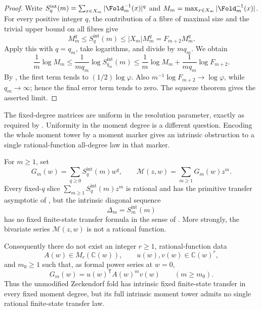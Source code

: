 \begin{proof}
Write
\(S_q^{\mathrm{int}}(m)=\sum_{x\in X_m}|\Fold_m^{-1}(x)|^q\) and
\(M_m=\max_{x\in X_m}|\Fold_m^{-1}(x)|\).  For every positive integer \(q\),
the contribution of a fibre of maximal size and the trivial upper bound on all
fibres give
\[
  M_m^q\le S_q^{\mathrm{int}}(m)\le |X_m|M_m^q=F_{m+2}M_m^q .
\]
Apply this with \(q=q_m\), take logarithms, and divide by \(m q_m\).  We obtain
\[
  \frac1m\log M_m
  \le
  \frac{1}{m q_m}\log S_{q_m}^{\mathrm{int}}(m)
  \le
  \frac1m\log M_m+\frac{1}{m q_m}\log F_{m+2} .
\]
By , the first term tends to
\((1/2)\log\varphi\).  Also
\(m^{-1}\log F_{m+2}\to\log\varphi\), while \(q_m\to\infty\); hence the final
error term tends to zero.  The squeeze theorem gives the asserted limit.
\end{proof}

The fixed-degree matrices are uniform in the resolution parameter, exactly as
required by .  Uniformity in the moment
degree is a different question.  Encoding the whole moment tower by a moment
marker gives an intrinsic obstruction to a single rational-function all-degree
law in that marker.

\begin{theorem}
\label{thm:intrinsic-all-degree-transfer-obstruction}
For \(m\ge1\), set
\[
  G_m(w)=\sum_{q\ge0}S_q^{\mathrm{int}}(m)w^q,
  \qquad
  \mathcal M(z,w)=\sum_{m\ge1}G_m(w)z^m.
\]
Every fixed-\(q\) slice
\(\sum_{m\ge1}S_q^{\mathrm{int}}(m)z^m\) is rational and has the primitive
transfer asymptotic of
,
but the intrinsic diagonal sequence
\[
  \Delta_m=S_m^{\mathrm{int}}(m)
\]
has no fixed finite-state transfer formula in the sense of
.  More strongly, the bivariate series
\(\mathcal M(z,w)\) is not a rational function.

Consequently there do not exist an integer \(r\ge1\), rational-function data
\[
  A(w)\in M_r(\mathbb C(w)),
  \qquad u(w),v(w)\in\mathbb C(w)^r,
\]
and \(m_0\ge1\) such that, as formal power series at \(w=0\),
\[
  G_m(w)=u(w)^{\mathsf T}A(w)^m v(w)
  \qquad(m\ge m_0).
\]
Thus the unmodified Zeckendorf fold has intrinsic fixed finite-state transfer in
every fixed moment degree, but its full intrinsic moment tower admits no single
rational finite-state transfer law.
\end{theorem}

